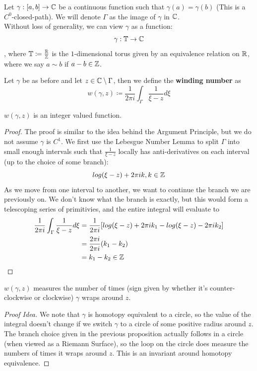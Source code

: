 Let $\gamma: [a, b] \to \mathbb{C}$ be a continuous function such that $\gamma(a) = \gamma(b)$ (This is a $C^0$-closed-path). We will denote $\Gamma$ as the image of $\gamma$ in $\mathbb{C}$.\\

Without loss of generality, we can view $\gamma$ as a function:
\[\gamma: \mathbb{T} \to \mathbb{C}\]
, where $\mathbb{T} \coloneqq \frac{\mathbb{R}}{\mathbb{Z}}$ is the $1$-dimensional torus given by an equivalence relation on $\mathbb{R}$, where we say $a \sim b$ if $a - b \in \mathbb{Z}$.

\begin{definition}
Let $\gamma$ be as before and let $z \in \mathbb{C} \setminus \Gamma$, then we define the \textbf{winding number} as
\[w(\gamma, z) \coloneqq \frac{1}{2\pi i} \int_{\Gamma} \frac{1}{\xi - z} d\xi\]
\end{definition}

\begin{proposition}
$w(\gamma, z)$ is an integer valued function.
\end{proposition}

\begin{proof}
The proof is similar to the idea behind the Argument Principle, but we do not assume $\gamma$ is $C^1$. We first use the Lebesgue Number Lemma to split $\Gamma$ into small enough intervals such that $\frac{1}{\xi - z}$ locally has anti-derivatives on each interval (up to the choice of some branch):
\[log(\xi - z) + 2\pi i k, k \in \mathbb{Z}\]
As we move from one interval to another, we want to continue the branch we are previously on. We don't know what the branch is exactly, but this would form a telescoping series of primitivies, and the entire integral will evaluate to
\begin{align*}
    \frac{1}{2\pi i} \int_{\Gamma} \frac{1}{\xi - z} d\xi &= \frac{1}{2\pi i} [log(\xi - z) + 2\pi i k_1 - log(\xi - z) - 2\pi i k_2]\\
    &= \frac{2\pi i}{2\pi i}(k_1 - k_2)\\
    &= k_1 - k_2 \in \mathbb{Z}
\end{align*}
\end{proof}

\begin{proposition}
$w(\gamma, z)$ measures the number of times (sign given by whether it's counter-clockwise or clockwise) $\gamma$ wraps around $z$.
\end{proposition}

\begin{proof}[Proof Idea]
We note that $\gamma$ is homotopy equivalent to a circle, so the value of the integral doesn't change if we switch $\gamma$ to a circle of some positive radius around $z$. The branch choice given in the previous proposition actually follows in a circle (when viewed as a Riemann Surface), so the loop on the circle does measure the numbers of times it wraps around $z$. This is an invariant around homotopy equivalence.
\end{proof}

